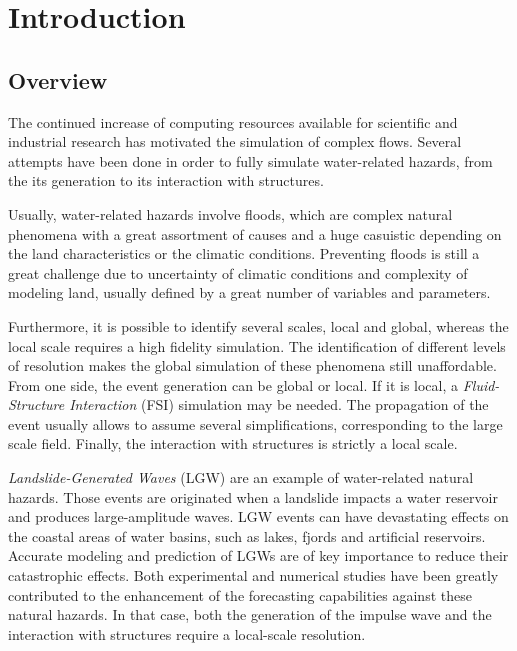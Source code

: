 
\chapter{Introduction}
\label{chapter_introduction}




\section{Overview}


The continued increase of computing resources available for scientific and industrial research has motivated the simulation of complex flows. Several attempts have been done in order to fully simulate water-related hazards, from the its generation to its interaction with structures.

Usually, water-related hazards involve floods, which are complex natural phenomena with a great assortment of causes and a huge casuistic depending on the land characteristics or the climatic conditions. Preventing floods is still a great challenge due to uncertainty of climatic conditions and complexity of modeling land, usually defined by a great number of variables and parameters.

Furthermore, it is possible to identify several scales, local and global, whereas the local scale requires a high fidelity simulation. The identification of different levels of resolution makes the global simulation of these phenomena still unaffordable. From one side, the event generation can be global or local. If it is local, a \emph{Fluid-Structure Interaction} (FSI) simulation may be needed. The propagation of the event usually allows to assume several simplifications, corresponding to the large scale field. Finally, the interaction with structures is strictly a local scale.

\emph{Landslide-Generated Waves} (LGW) are an example of water-related natural hazards. Those events are originated when a landslide impacts a water reservoir and produces large-amplitude waves. LGW events can have devastating effects on the coastal areas of water basins, such as lakes, fjords and artificial reservoirs. Accurate modeling and prediction of LGWs are of key importance to reduce their catastrophic effects. Both experimental and numerical studies have been greatly contributed to the enhancement of the forecasting capabilities against these natural hazards. In that case, both the generation of the impulse wave and the interaction with structures require a local-scale resolution.

